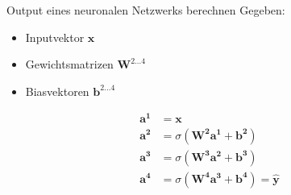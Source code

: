   \begin{frame}{Output eines neuronalen Netzwerks berechnen}
    Gegeben:
    \begin{itemize}
    \item Inputvektor \(\mathbf{x}\)
    \item Gewichtsmatrizen \(\mathbf{W}^{2 \ldots 4}\)
    \item Biasvektoren \(\mathbf{b}^{2 \ldots 4}\)
    \end{itemize}

    \begin{align*}
      \mathbf{a^{1}} &= \mathbf{x}\\
      \mathbf{a^{2}} &= \sigma(\mathbf{W^{2}a^{1}} + \mathbf{b^{2}})\\
      \mathbf{a^{3}} &= \sigma(\mathbf{W^{3}a^{2}} + \mathbf{b^{3}})\\
      \mathbf{a^{4}} &= \sigma(\mathbf{W^{4}a^{3}} + \mathbf{b^{4}}) = \mathbf{\hat{y}}
    \end{align*}
  \end{frame}

